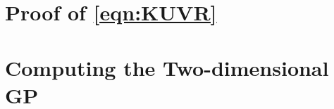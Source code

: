 \documentclass[preprint2]{aastex62}
\begin{document}
\section{Proof of \ref{eqn:KUVR}}
\label{sec:Kproof}
\section{Computing the Two-dimensional GP}
\label{sec:algorithms}









\end{document}
